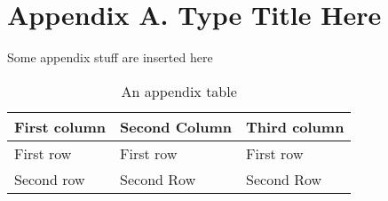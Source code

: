 \clearpage
{}
{}
\part*{Appendix A. Type Title Here}
\thispagestyle{empty} %
Some appendix stuff are inserted here
\renewcommand{\thetable}{A.\arabic{table}}
\begin{table}[hbtp]
  \centering
  \captionsetup{width=0.7\textwidth}
  \caption{An appendix table}
    \begin{tabularx}{0.7\textwidth}{L L L}
    \hline
    First column & Second Column & Third column\\
    \hline
    First row & First row & First row\\
    Second row & Second Row & Second Row\\
    \hline
    \end{tabularx}
  \label{tab:appendix_table_1}
\end{table}